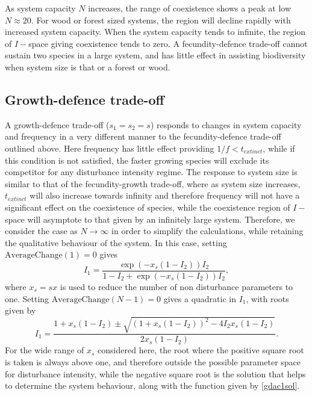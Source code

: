 \documentclass[preprint,10pt,reqno]{amsart}
\begin{document}
As system capacity $N$ increases, the range of coexistence shows a peak at low $N \approx 20$. For wood or forest sized systems, the region will decline rapidly with increased system capacity. When the system capacity tends to infinite, the region of $I-$space giving coexistence tends to zero. A fecundity-defence trade-off cannot sustain two species in a large system, and has little effect in assisting biodiversity when system size is that or a forest or wood.

\subsection{Growth-defence trade-off}
A growth-defence trade-off ($s_1=s_2=s$) responds to changes in system capacity and frequency in a very different manner to the fecundity-defence trade-off outlined above. Here frequency has little effect providing $1/f<t_{extinct}$, while if this condition is not satisfied, the faster growing species will exclude its competitor for any disturbance intensity regime. The response to system size is similar to that of the fecundity-growth trade-off, where as system size increases, $t_{extinct}$ will also increase towards infinity and therefore frequency will not have a significant effect on the coexistence of species, while the coexistence region of $I-$space will asymptote to that given by an infinitely large system. Therefore, we consider the case as $N \to \infty$ in order to simplify the calculations, while retaining the qualitative behaviour of the system. In this case, setting $\text{AverageChange}(1)=0$ gives
\begin{equation}
\label{gdac1sol}
I_1=\frac{\exp(-x_s(1-I_2))I_2}{1-I_2+\exp(-x_s(1-I_2))I_2},
\end{equation}
where $x_s=sx$ is used to reduce the number of non disturbance parameters to one. Setting $\text{AverageChange}(N-1)=0$ gives a quadratic in $I_1$, with roots given by
\begin{equation}
\label{gdacnsol}
I_1=\frac{1+x_s(1-I_2) \pm \sqrt{(1+x_s(1-I_2))^2-4I_2x_s(1-I_2)}}{2x_s(1-I_2)}.
\end{equation}
For the wide range of $x_s$ considered here, the root where the positive square root is taken is always above one, and therefore outside the possible parameter space for disturbance intensity, while the negative square root is the solution that helps to determine the system behaviour, along with the function given by \eqref{gdac1sol}.
\end{document}
